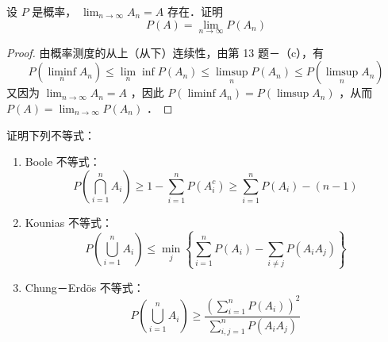 \begin{exercise}
    设 $P$ 是概率， $\lim _{n \rightarrow \infty} A_n=A$ 存在．证明
    $$
        P(A)=\lim _{n \rightarrow \infty} P\left(A_n\right)
    $$
\end{exercise}
\begin{proof}
    由概率测度的从上（从下）连续性，由第 13 题－（c），有
    $$
        P\left(\liminf _n A_n\right) \leqslant \lim _n \inf P\left(A_n\right) \leqslant \limsup _n P\left(A_n\right) \leqslant P\left(\limsup _n A_n\right)
    $$
    又因为 $\lim _{n \rightarrow \infty} A_n=A$ ，因此 $P\left(\liminf A_n\right)=P\left(\limsup A_n\right)$ ，从而 $P(A)=\lim _{n \rightarrow \infty} P\left(A_n\right)$ ．
\end{proof}
\begin{exercise}
    证明下列不等式：
    \begin{enumerate}
        \item Boole 不等式：
              $$
                  P\left(\bigcap_{i=1}^n A_i\right) \geqslant 1-\sum_{i=1}^n P\left(A_i^c\right) \geqslant \sum_{i=1}^n P\left(A_i\right)-(n-1)
              $$
        \item Kounias 不等式：
              $$
                  P\left(\bigcup_{i=1}^n A_i\right) \leqslant \min _j\left\{\sum_{i=1}^n P\left(A_i\right)-\sum_{i \neq j} P\left(A_i A_j\right)\right\}
              $$
        \item Chung－Erdös 不等式：
              $$
                  P\left(\bigcup_{i=1}^n A_i\right) \geqslant \frac{\left(\sum_{i=1}^n P\left(A_i\right)\right)^2}{\sum_{i, j=1}^n P\left(A_i A_j\right)}
              $$
    \end{enumerate}
\end{exercise}
